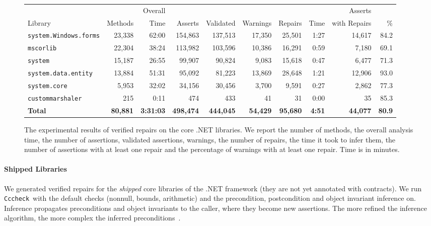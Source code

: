 \documentclass[10pt]{sigplanconf}
\newcommand{\labelFig}[1]{\label{fig:#1}}
\newcommand{\code}[1]{\texttt{#1}}
\newcommand{\Clousot}{\code{Cccheck}}
\begin{document}
\begin{figure*}[t]
\centering
\begin{tabular}{@{}l | r r |r r r| r r | r r @{}}
                             &              & Overall    &            &            &               &             &       & Asserts          & \\
Library                      &      Methods &       Time & Asserts    & Validated  & Warnings      & Repairs     & Time  & with    Repairs  & \%    \\
\hline
\code{system.Windows.forms}  & 23,338       & 62:00      & 154,863    & 137,513    & 17,350        & 25,501      & 1:27  & 14,617           & 84.2 \\
\code{mscorlib}              & 22,304       & 38:24      & 113,982    & 103,596    & 10,386        & 16,291      & 0:59  & 7,180            & 69.1 \\ 
\code{system}                & 15,187       & 26:55      & 99,907    &  90,824    &  9,083        & 15,618      & 0:47  & 6,477            & 71.3 \\
\code{system.data.entity}    & 13,884       & 51:31      & 95,092    &  81,223    & 13,869        & 28,648      & 1:21  & 12,906           & 93.0 \\
\code{system.core}           &  5,953       & 32:02      & 34,156    &  30,456    &  3,700        & 9,591       & 0:27  & 2,862            & 77.3 \\
\code{custommarshaler}       &    215       &  0:11      &  474      &     433    &    41         &  31         & 0:00  &  35              & 85.3 \\
\hline
\textbf{Total}               &\textbf{80,881} &\textbf{3:31:03}     & \textbf{498,474}        & \textbf{444,045}    & \textbf{54,429}     & \textbf{95,680}    & \textbf{4:51}  & \textbf{44,077}                   &\textbf{80.9}
\end{tabular}
\caption{The experimental results of verified repairs on the core .NET libraries. 
We report the number of methods, the overall analysis time, the number of assertions, validated assertions, warnings, the
number of repairs, the time it took to infer them, the number of
assertions with at least one repair and the percentage of warnings with
at least one repair. Time is in minutes.}
\labelFig{experience}
\end{figure*}




\paragraph{Shipped Libraries}
We generated verified repairs for the \emph{shipped} core libraries
of the .NET framework (they are not yet annotated with contracts).
We run \Clousot\ with the default checks (nonnull, bounds, arithmetic)
and the precondition, postcondition and object invariant inference on.
Inference propagates preconditions and object invariants to the
caller, where they become new assertions.  The more refined the
inference algorithm, the more complex the inferred
preconditions~\cite{CousotCousotLogozzo-VMCAI11}.  
\end{document}
